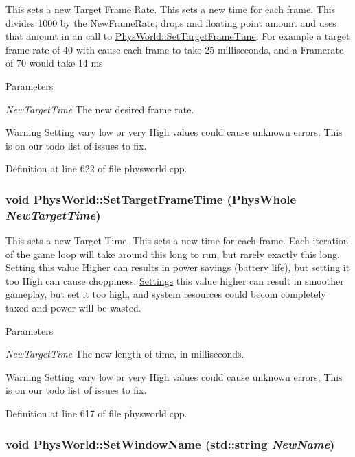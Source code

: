 This sets a new Target Frame Rate. This sets a new time for each frame. This divides 1000 by the NewFrameRate, drops and floating point amount and uses that amount in an call to \hyperlink{classPhysWorld_ab1c6f9286bd97eb502d8b0ddc4954566}{PhysWorld::SetTargetFrameTime}. For example a target frame rate of 40 with cause each frame to take 25 milliseconds, and a Framerate of 70 would take 14 ms 
\begin{DoxyParams}{Parameters}
\item[{\em NewTargetTime}]The new desired frame rate. \end{DoxyParams}
\begin{DoxyWarning}{Warning}
Setting vary low or very High values could cause unknown errors, This is on our todo list of issues to fix. 
\end{DoxyWarning}


Definition at line 622 of file physworld.cpp.\hypertarget{classPhysWorld_ab1c6f9286bd97eb502d8b0ddc4954566}{
\subsubsection[{SetTargetFrameTime}]{\setlength{\rightskip}{0pt plus 5cm}void PhysWorld::SetTargetFrameTime (PhysWhole {\em NewTargetTime})}}
\label{db/df5/classPhysWorld_ab1c6f9286bd97eb502d8b0ddc4954566}


This sets a new Target Time. This sets a new time for each frame. Each iteration of the game loop will take around this long to run, but rarely exactly this long. Setting this value Higher can results in power savings (battery life), but setting it too High can cause choppiness. \hyperlink{classSettings}{Settings} this value higher can result in smoother gameplay, but set it too high, and system resources could becom completely taxed and power will be wasted. 
\begin{DoxyParams}{Parameters}
\item[{\em NewTargetTime}]The new length of time, in milliseconds. \end{DoxyParams}
\begin{DoxyWarning}{Warning}
Setting vary low or very High values could cause unknown errors, This is on our todo list of issues to fix. 
\end{DoxyWarning}


Definition at line 617 of file physworld.cpp.\hypertarget{classPhysWorld_adb5ba2b5a3140c5d7033d3180e3f7342}{
\subsubsection[{SetWindowName}]{\setlength{\rightskip}{0pt plus 5cm}void PhysWorld::SetWindowName (std::string {\em NewName})}}
\label{db/df5/classPhysWorld_adb5ba2b5a3140c5d7033d3180e3f7342}


